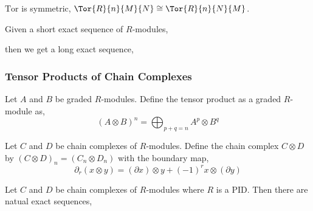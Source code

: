 \documentclass[12pt]{extarticle}
\begin{document}
\begin{proposition}
$\mathrm{Tor}$ is symmetric, $\Tor{R}{n}{M}{N} \cong \Tor{R}{n}{N}{M}$.
\end{proposition}

\begin{proposition}
Given a short exact sequence of $R$-modules,
\begin{center}
\end{center}
then we get a long exact sequence,
\begin{center}
\end{center}
\end{proposition}



\subsubsection{Tensor Products of Chain Complexes}

\begin{definition}
Let $A$ and $B$ be graded $R$-modules. Define the tensor product as a graded $R$-module as,
\[ (A \otimes B)^n = \bigoplus_{p+q = n} A^p \otimes B^q \]
\end{definition}

\begin{definition}
Let $C$ and $D$ be chain complexes of $R$-modules. Define the chain complex $C \otimes D$ by $(C \otimes D)_n = (C_n \otimes D_n)$ with the boundary map,
\[ \partial_r (x \otimes y) = (\partial x) \otimes y + (-1)^r x \otimes (\partial y) \] 
\end{definition}

\begin{theorem}
Let $C$ and $D$ be chain complexes of $R$-modules where $R$ is a PID. Then there are natual exact sequences,
\begin{center}
\end{center}
\end{theorem}
\end{document}
